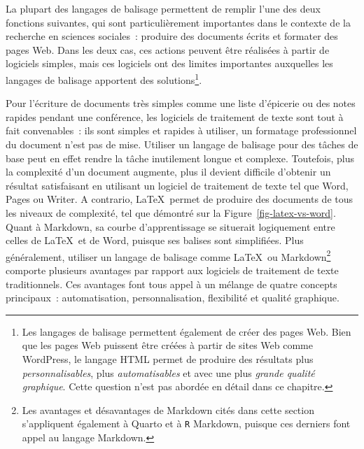 \documentclass[
  letterpaper,
]{scrbook}
\begin{document}
La plupart des langages de balisage permettent de remplir l'une des deux
fonctions suivantes, qui sont particulièrement importantes dans le
contexte de la recherche en sciences sociales~: produire des documents
écrits et formater des pages Web. Dans les deux cas, ces actions peuvent
être réalisées à partir de logiciels simples, mais ces logiciels ont des
limites importantes auxquelles les langages de balisage apportent des
solutions\footnote{Les langages de balisage permettent également de
  créer des pages Web. Bien que les pages Web puissent être créées à
  partir de sites Web comme WordPress, le langage HTML permet de
  produire des résultats plus \emph{personnalisables}, plus
  \emph{automatisables} et avec une plus \emph{grande qualité
  graphique}. Cette question n'est pas abordée en détail dans ce
  chapitre.}.

Pour l'écriture de documents très simples comme une liste d'épicerie ou
des notes rapides pendant une conférence, les logiciels de traitement de
texte sont tout à fait convenables~: ils sont simples et rapides à
utiliser, un formatage professionnel du document n'est pas de mise.
Utiliser un langage de balisage pour des tâches de base peut en effet
rendre la tâche inutilement longue et complexe. Toutefois, plus la
complexité d'un document augmente, plus il devient difficile d'obtenir
un résultat satisfaisant en utilisant un logiciel de traitement de texte
tel que Word, Pages ou Writer. A contrario, \LaTeX~permet de produire
des documents de tous les niveaux de complexité, tel que démontré sur la
Figure~\ref{fig-latex-vs-word}. Quant à Markdown, sa courbe
d'apprentissage se situerait logiquement entre celles de \LaTeX~et de
Word, puisque ses balises sont simplifiées. Plus généralement, utiliser
un langage de balisage comme \LaTeX~ou Markdown\footnote{Les avantages
  et désavantages de Markdown cités dans cette section s'appliquent
  également à Quarto et à \texttt{R} Markdown, puisque ces derniers font
  appel au langage Markdown.} comporte plusieurs avantages par rapport
aux logiciels de traitement de texte traditionnels. Ces avantages font
tous appel à un mélange de quatre concepts principaux~: automatisation,
personnalisation, flexibilité et qualité graphique.
\end{document}
